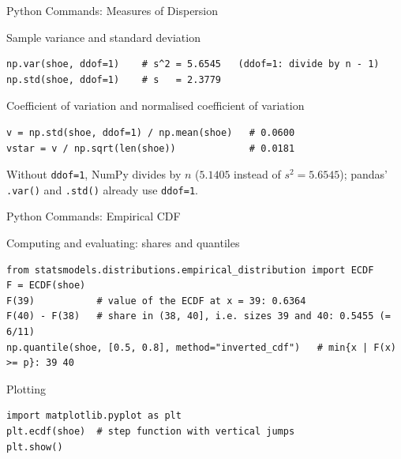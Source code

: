 \documentclass[aspectratio=169,11pt]{beamer}
\begin{document}
\begin{frame}[fragile]{Python Commands: Measures of Dispersion}
  \begin{block}{Sample variance and standard deviation}
    \begin{lstlisting}
np.var(shoe, ddof=1)    # s^2 = 5.6545   (ddof=1: divide by n - 1)
np.std(shoe, ddof=1)    # s   = 2.3779
    \end{lstlisting}
  \end{block}
  \begin{block}{Coefficient of variation and normalised coefficient of variation}
    \begin{lstlisting}
v = np.std(shoe, ddof=1) / np.mean(shoe)   # 0.0600
vstar = v / np.sqrt(len(shoe))             # 0.0181
    \end{lstlisting}
  \end{block}
  \footnotesize Without \texttt{ddof=1}, NumPy divides by $n$ ($5.1405$ instead of
  $s^2 = 5.6545$); pandas' \texttt{.var()} and \texttt{.std()} already use \texttt{ddof=1}.
\end{frame}

\begin{frame}[fragile]{Python Commands: Empirical CDF}
  \begin{block}{Computing and evaluating: shares and quantiles}
    \begin{lstlisting}
from statsmodels.distributions.empirical_distribution import ECDF
F = ECDF(shoe)
F(39)           # value of the ECDF at x = 39: 0.6364
F(40) - F(38)   # share in (38, 40], i.e. sizes 39 and 40: 0.5455 (= 6/11)
np.quantile(shoe, [0.5, 0.8], method="inverted_cdf")   # min{x | F(x) >= p}: 39 40
    \end{lstlisting}
  \end{block}
  \begin{block}{Plotting}
    \begin{lstlisting}
import matplotlib.pyplot as plt
plt.ecdf(shoe)  # step function with vertical jumps
plt.show()
    \end{lstlisting}
  \end{block}
\end{frame}
\end{document}
